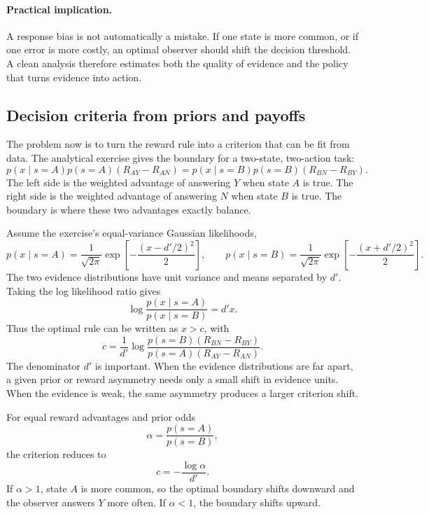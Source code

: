 \paragraph{Practical implication.}
A response bias is not automatically a mistake. If one state is more common, or if one error is more costly, an optimal observer should shift the decision threshold. A clean analysis therefore estimates both the quality of evidence and the policy that turns evidence into action.

\subsection{Decision criteria from priors and payoffs}

The problem now is to turn the reward rule into a criterion that can be fit from data. The analytical exercise gives the boundary for a two-state, two-action task:
\[
  p(x\mid s=A)p(s=A)(R_{AY}-R_{AN})
  =
  p(x\mid s=B)p(s=B)(R_{BN}-R_{BY}).
\]
The left side is the weighted advantage of answering \(Y\) when state \(A\) is true. The right side is the weighted advantage of answering \(N\) when state \(B\) is true. The boundary is where these two advantages exactly balance.

Assume the exercise's equal-variance Gaussian likelihoods,
\[
  p(x\mid s=A)
  =
  \frac{1}{\sqrt{2\pi}}
  \exp\!\left[-\frac{(x-d'/2)^2}{2}\right],
  \qquad
  p(x\mid s=B)
  =
  \frac{1}{\sqrt{2\pi}}
  \exp\!\left[-\frac{(x+d'/2)^2}{2}\right].
\]
The two evidence distributions have unit variance and means separated by \(d'\). Taking the log likelihood ratio gives
\[
  \log\frac{p(x\mid s=A)}{p(x\mid s=B)}
  =
  d'x.
\]
Thus the optimal rule can be written as \(x>c\), with
\[
  c
  =
  \frac{1}{d'}
  \log
  \frac{p(s=B)(R_{BN}-R_{BY})}
       {p(s=A)(R_{AY}-R_{AN})}.
\]
The denominator \(d'\) is important. When the evidence distributions are far apart, a given prior or reward asymmetry needs only a small shift in evidence units. When the evidence is weak, the same asymmetry produces a larger criterion shift.

For equal reward advantages and prior odds
\[
  \alpha=\frac{p(s=A)}{p(s=B)},
\]
the criterion reduces to
\[
  c=-\frac{\log\alpha}{d'}.
\]
If \(\alpha>1\), state \(A\) is more common, so the optimal boundary shifts downward and the observer answers \(Y\) more often. If \(\alpha<1\), the boundary shifts upward.

